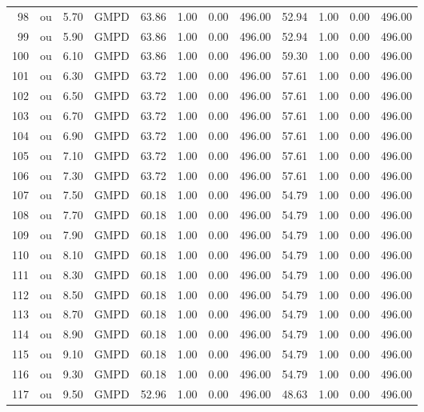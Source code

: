 \begin{table}[ht]
\begin{tabular}{rlrlrrrrrrrr}
  98 & ou & 5.70 & GMPD & 63.86 & 1.00 & 0.00 & 496.00 & 52.94 & 1.00 & 0.00 & 496.00 \\ 
  99 & ou & 5.90 & GMPD & 63.86 & 1.00 & 0.00 & 496.00 & 52.94 & 1.00 & 0.00 & 496.00 \\ 
  100 & ou & 6.10 & GMPD & 63.86 & 1.00 & 0.00 & 496.00 & 59.30 & 1.00 & 0.00 & 496.00 \\ 
  101 & ou & 6.30 & GMPD & 63.72 & 1.00 & 0.00 & 496.00 & 57.61 & 1.00 & 0.00 & 496.00 \\ 
  102 & ou & 6.50 & GMPD & 63.72 & 1.00 & 0.00 & 496.00 & 57.61 & 1.00 & 0.00 & 496.00 \\ 
  103 & ou & 6.70 & GMPD & 63.72 & 1.00 & 0.00 & 496.00 & 57.61 & 1.00 & 0.00 & 496.00 \\ 
  104 & ou & 6.90 & GMPD & 63.72 & 1.00 & 0.00 & 496.00 & 57.61 & 1.00 & 0.00 & 496.00 \\ 
  105 & ou & 7.10 & GMPD & 63.72 & 1.00 & 0.00 & 496.00 & 57.61 & 1.00 & 0.00 & 496.00 \\ 
  106 & ou & 7.30 & GMPD & 63.72 & 1.00 & 0.00 & 496.00 & 57.61 & 1.00 & 0.00 & 496.00 \\ 
  107 & ou & 7.50 & GMPD & 60.18 & 1.00 & 0.00 & 496.00 & 54.79 & 1.00 & 0.00 & 496.00 \\ 
  108 & ou & 7.70 & GMPD & 60.18 & 1.00 & 0.00 & 496.00 & 54.79 & 1.00 & 0.00 & 496.00 \\ 
  109 & ou & 7.90 & GMPD & 60.18 & 1.00 & 0.00 & 496.00 & 54.79 & 1.00 & 0.00 & 496.00 \\ 
  110 & ou & 8.10 & GMPD & 60.18 & 1.00 & 0.00 & 496.00 & 54.79 & 1.00 & 0.00 & 496.00 \\ 
  111 & ou & 8.30 & GMPD & 60.18 & 1.00 & 0.00 & 496.00 & 54.79 & 1.00 & 0.00 & 496.00 \\ 
  112 & ou & 8.50 & GMPD & 60.18 & 1.00 & 0.00 & 496.00 & 54.79 & 1.00 & 0.00 & 496.00 \\ 
  113 & ou & 8.70 & GMPD & 60.18 & 1.00 & 0.00 & 496.00 & 54.79 & 1.00 & 0.00 & 496.00 \\ 
  114 & ou & 8.90 & GMPD & 60.18 & 1.00 & 0.00 & 496.00 & 54.79 & 1.00 & 0.00 & 496.00 \\ 
  115 & ou & 9.10 & GMPD & 60.18 & 1.00 & 0.00 & 496.00 & 54.79 & 1.00 & 0.00 & 496.00 \\ 
  116 & ou & 9.30 & GMPD & 60.18 & 1.00 & 0.00 & 496.00 & 54.79 & 1.00 & 0.00 & 496.00 \\ 
  117 & ou & 9.50 & GMPD & 52.96 & 1.00 & 0.00 & 496.00 & 48.63 & 1.00 & 0.00 & 496.00 \\ 

\end{tabular}
\end{table}
